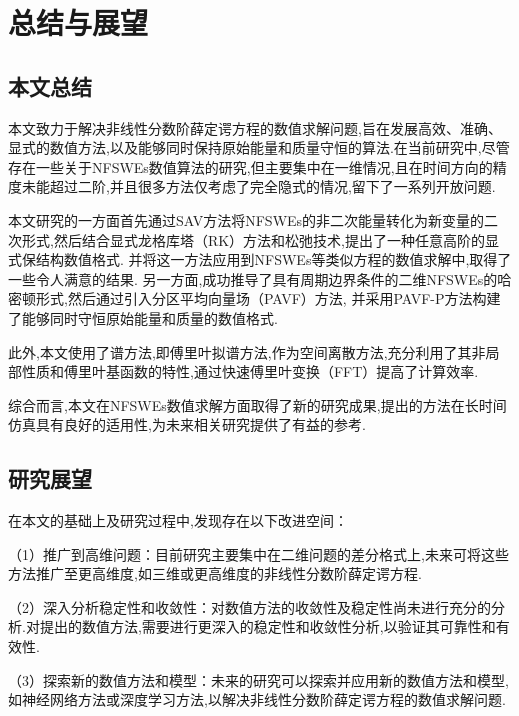 
\chapter[总结与展望]{总结与展望}
\section{本文总结}

本文致力于解决非线性分数阶薛定谔方程的数值求解问题,旨在发展高效、准确、显式的数值方法,以及能够同时保持原始能量和质量守恒的算法.在当前研究中,尽管存在一些关于NFSWEs数值算法的研究,但主要集中在一维情况,且在时间方向的精度未能超过二阶,并且很多方法仅考虑了完全隐式的情况,留下了一系列开放问题.

本文研究的一方面首先通过SAV方法将NFSWEs的非二次能量转化为新变量的二次形式,然后结合显式龙格库塔（RK）方法和松弛技术,提出了一种任意高阶的显式保结构数值格式.
并将这一方法应用到NFSWEs等类似方程的数值求解中,取得了一些令人满意的结果.
另一方面,成功推导了具有周期边界条件的二维NFSWEs的哈密顿形式,然后通过引入分区平均向量场（PAVF）方法,
并采用PAVF-P方法构建了能够同时守恒原始能量和质量的数值格式.

此外,本文使用了谱方法,即傅里叶拟谱方法,作为空间离散方法,充分利用了其非局部性质和傅里叶基函数的特性,通过快速傅里叶变换（FFT）提高了计算效率.

综合而言,本文在NFSWEs数值求解方面取得了新的研究成果,提出的方法在长时间仿真具有良好的适用性,为未来相关研究提供了有益的参考.

\section{研究展望}
在本文的基础上及研究过程中,发现存在以下改进空间：

（1）推广到高维问题：目前研究主要集中在二维问题的差分格式上,未来可将这些方法推广至更高维度,如三维或更高维度的非线性分数阶薛定谔方程.

（2）深入分析稳定性和收敛性：对数值方法的收敛性及稳定性尚未进行充分的分析.对提出的数值方法,需要进行更深入的稳定性和收敛性分析,以验证其可靠性和有效性.

（3）探索新的数值方法和模型：未来的研究可以探索并应用新的数值方法和模型,如神经网络方法或深度学习方法,以解决非线性分数阶薛定谔方程的数值求解问题.